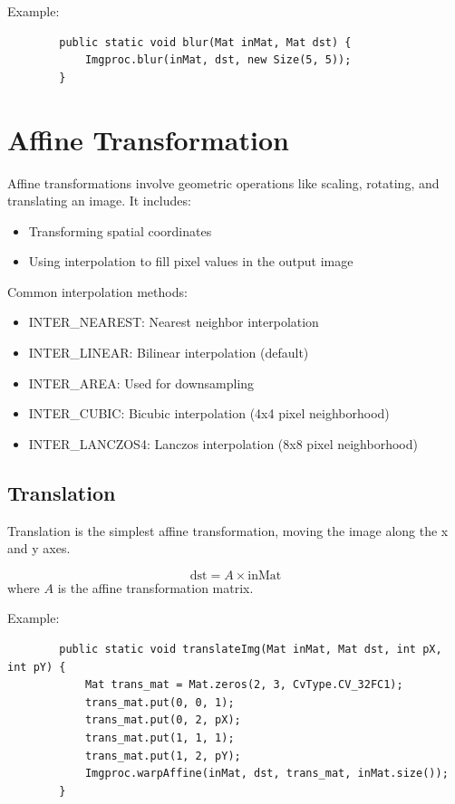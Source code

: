 \documentclass{article}
\begin{document}
	Example:
	\begin{verbatim}
		public static void blur(Mat inMat, Mat dst) {
			Imgproc.blur(inMat, dst, new Size(5, 5));
		}
	\end{verbatim}
	
	\section{Affine Transformation}
	Affine transformations involve geometric operations like scaling, rotating, and translating an image. It includes:
	\begin{itemize}
		\item Transforming spatial coordinates
		\item Using interpolation to fill pixel values in the output image
	\end{itemize}
	
	Common interpolation methods:
	\begin{itemize}
		\item INTER\_NEAREST: Nearest neighbor interpolation
		\item INTER\_LINEAR: Bilinear interpolation (default)
		\item INTER\_AREA: Used for downsampling
		\item INTER\_CUBIC: Bicubic interpolation (4x4 pixel neighborhood)
		\item INTER\_LANCZOS4: Lanczos interpolation (8x8 pixel neighborhood)
	\end{itemize}
	
	\subsection{Translation}
	Translation is the simplest affine transformation, moving the image along the x and y axes.
	
	\begin{equation}
		\text{dst} = A \times \text{inMat}
	\end{equation}
	where $A$ is the affine transformation matrix.
	
	Example:
	\begin{verbatim}
		public static void translateImg(Mat inMat, Mat dst, int pX, int pY) {
			Mat trans_mat = Mat.zeros(2, 3, CvType.CV_32FC1);
			trans_mat.put(0, 0, 1);
			trans_mat.put(0, 2, pX);
			trans_mat.put(1, 1, 1);
			trans_mat.put(1, 2, pY);
			Imgproc.warpAffine(inMat, dst, trans_mat, inMat.size());
		}
	\end{verbatim}
	
\end{document}
